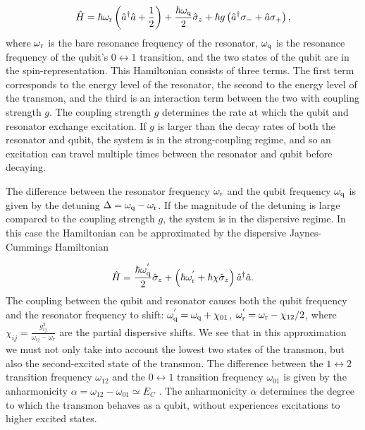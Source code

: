         \begin{equation}
          \hat{H} = \hbar \omega_\text{r}\left(\hat{a}^\dagger \hat{a} + \frac{1}{2} \right) + \frac{\hbar \omega_\text{q}}{2}\hat{\sigma}_z + \hbar g \left(\hat{a}^\dagger \sigma_{-} + \hat{a}\sigma_{+}\right),
          \label{eq:Jaynes-Cummings}
        \end{equation}
        where $\omega_\text{r}$ is the bare resonance frequency of the resonator, $\omega_\text{q}$ is the resonance frequency of the qubit's $0\leftrightarrow 1$ transition, and the two states of the qubit are in the spin-representation. This Hamiltonian consists of three terms. The first term corresponds to the energy level of the resonator, the second to the energy level of the transmon, and the third is an interaction term between the two with coupling strength $g$. The coupling strength $g$ determines the rate at which the qubit and resonator exchange excitation. If $g$ is larger than the decay rates of both the resonator and qubit, the system is in the strong-coupling regime, and so an excitation can travel multiple times between the resonator and qubit before decaying.

        The difference between the resonator frequency $\omega_\text{r}$ and the qubit frequency $\omega_\text{q}$ is given by the detuning $\Delta = \omega_\text{q} - \omega_\text{r}$. If the magnitude of the detuning is large compared to the coupling strength $g$, the system is in the dispersive regime. In this case the Hamiltonian can be approximated by the dispersive Jaynes-Cummings Hamiltonian

        \begin{equation}
          \hat{H} = \frac{\hbar \omega_\text{q}^{'}}{2} \hat{\sigma}_z +  \left(\hbar \omega_\text{r}^{'} + \hbar \chi \hat{\sigma}_z\right) \hat{a}^\dagger \hat{a}.
          \label{eq:dispersive-Jaynes-Cummings}
        \end{equation}
        The coupling between the qubit and resonator causes both the qubit frequency and the resonator frequency to shift: $\omega_\text{q}^{'} = \omega_\text{q} + \chi_{01}$, $\omega_\text{r}^{'}=\omega_\text{r} - \chi_{12}/2$, where $\chi_{ij} = \frac{g_{ij}^2}{\omega_{ij}-\omega_r}$ are the partial dispersive shifts. We see that in this approximation we must not only take into account the lowest two states of the transmon, but also the second-excited state of the transmon. The difference between the $1\leftrightarrow 2$ transition frequency $\omega_{12}$ and the $0\leftrightarrow 1$ transition frequency $\omega_{01}$ is given by the anharmonicity $\alpha=\omega_{12} - \omega_{01} \simeq E_C$ \cite{koch2007Transmon}. The anharmonicity $\alpha$ determines the degree to which the transmon behaves as a qubit, without experiences excitations to higher excited states.

